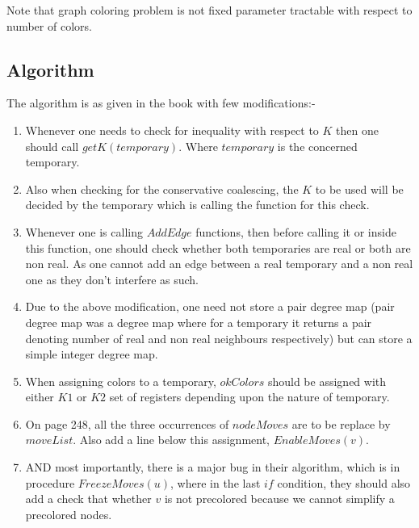 Note that graph coloring problem is not fixed parameter tractable with
respect to number of colors.

\hypertarget{algorithm}{%
\subsection{Algorithm}\label{algorithm}}

The algorithm is as given in the book with few modifications:-
\begin{enumerate}
  \item Whenever one needs to check for inequality with respect to $K$ then one should call $getK(temporary)$. Where $temporary$ is the concerned temporary.
  \item Also when checking for the conservative coalescing, the $K$ to be used will be decided by the temporary which is calling the function for this check.
  \item Whenever one is calling $AddEdge$ functions, then before calling it or inside this function, one should check whether both temporaries are real or both are non real. As one cannot add an edge between a real temporary and a non real one as they don't interfere as such.
  \item Due to the above modification, one need not store a pair degree map (pair degree map was a degree map where for a temporary it returns a pair denoting number of real and non real neighbours respectively) but can store a simple integer degree map.
  \item When assigning colors to a temporary, $okColors$ should be assigned with either $K1$ or $K2$ set of registers depending upon the nature of temporary.
  \item On page 248, all the three occurrences of $nodeMoves$ are to be replace by $moveList$. Also add a line below this assignment, $EnableMoves(v)$.
  \item AND most importantly, there is a major bug in their algorithm, which is in procedure $FreezeMoves(u)$, where in the last $if$ condition, they should also add a check that whether $v$ is not precolored because we cannot simplify a precolored nodes.
\end{enumerate}
